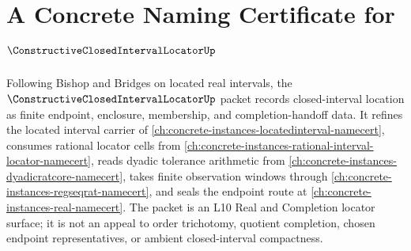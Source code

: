 \chapter{A Concrete Naming Certificate for $\ConstructiveClosedIntervalLocatorUp$}
\label{ch:concrete-instances-constructive-closed-interval-locator-namecert}

Following Bishop and Bridges on located real intervals, the $\ConstructiveClosedIntervalLocatorUp$ packet records closed-interval location as finite endpoint, enclosure, membership, and completion-handoff data. It refines the located interval carrier of \autoref{ch:concrete-instances-locatedinterval-namecert}, consumes rational locator cells from \autoref{ch:concrete-instances-rational-interval-locator-namecert}, reads dyadic tolerance arithmetic from \autoref{ch:concrete-instances-dyadicratcore-namecert}, takes finite observation windows through \autoref{ch:concrete-instances-regseqrat-namecert}, and seals the endpoint route at \autoref{ch:concrete-instances-real-namecert}. The packet is an L10 Real and Completion locator surface; it is not an appeal to order trichotomy, quotient completion, chosen endpoint representatives, or ambient closed-interval compactness.

